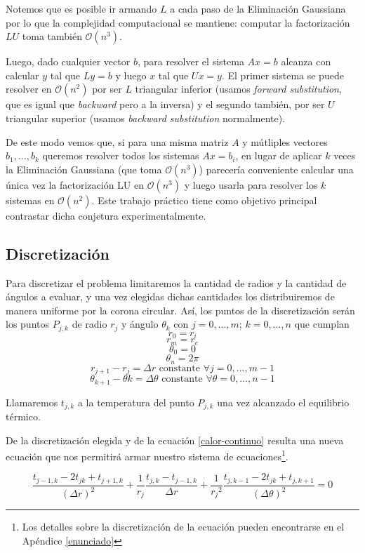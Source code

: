 Notemos que es posible ir armando $L$ a cada paso de la Eliminación Gaussiana por lo que la complejidad computacional se mantiene: computar la factorización $LU$ toma también $\mathcal{O}(n^3)$.

Luego, dado cualquier vector $b$, para resolver el sistema $Ax=b$ alcanza con calcular $y$ tal que $Ly=b$ y luego $x$ tal que $Ux=y$. El primer sistema se puede resolver en $\mathcal{O}(n^2)$ por ser $L$ triangular inferior (usamos \emph{forward substitution}, que es igual que \emph{backward} pero a la inversa) y el segundo también, por ser $U$ triangular superior (usamos \emph{backward substitution} normalmente).

De este modo vemos que, si para una misma matriz $A$ y mútliples vectores $b_1, \ldots, b_k$ queremos resolver todos los sistemas $Ax=b_i$, en lugar de aplicar $k$ veces la Eliminación Gaussiana (que toma $\mathcal{O}(n^3)$) parecería conveniente calcular una única vez la factorización LU en $\mathcal{O}(n^3)$ y luego usarla para resolver los $k$ sistemas en $\mathcal{O}(n^2)$. Este trabajo práctico tiene como objetivo principal contrastar dicha conjetura experimentalmente.

\subsection{Discretización}
Para discretizar el problema limitaremos la cantidad de radios y la cantidad de ángulos a evaluar, y una vez elegidas dichas cantidades los distribuiremos de manera uniforme por la corona circular. Así, los puntos de la discretización serán los puntos $P_{j,k}$ de radio $r_j$ y ángulo $\theta_k$ con $j = 0, \ldots, m$; $k = 0, \ldots, n$ que cumplan $$r_0 = r_i$$ $$r_m = r_e$$ $$\theta_0 = 0$$ $$\theta_n = 2\pi$$ $$r_{j+1}-r_{j} = \Delta r \text{ constante } \forall j = 0, \ldots, m-1$$ $$\theta_{k+1}-\theta{k} = \Delta \theta \text{ constante } \forall \theta = 0, \ldots, n-1$$

Llamaremos $t_{j,k}$ a la temperatura del punto $P_{j,k}$ una vez alcanzado el equilibrio térmico.

De la discretización elegida y de la ecuación \ref{calor-continuo} resulta una nueva ecuación que nos permitirá armar nuestro sistema de ecuaciones\footnote{Los detalles sobre la discretización de la ecuación pueden encontrarse en el Apéndice \ref{enunciado}}.

\begin{equation}\label{calor}
\frac{t_{j-1,k}-2t_{jk}+t_{j+1,k}}{(\Delta r)^2}+\frac{1}{r_j}\frac{t_{j,k}-t_{j-1,k}}{\Delta r}+\frac{1}{{r_j}^2}\frac{t_{j,k-1}-2t_{jk}+t_{j,k+1}}{(\Delta \theta)^2} = 0 
\end{equation}

